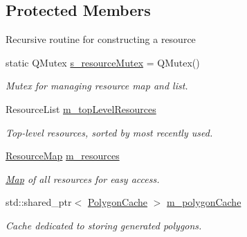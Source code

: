 \subsection*{Protected Members}
\label{_amgrp1407774ea7c5b7991aa8e311379c78d1}%
Recursive routine for constructing a resource \begin{DoxyCompactItemize}
\item 
\mbox{\label{classrev_1_1_resource_cache_a9f8b8e9321a559bdb205d26c7ae438ad}} 
static Q\+Mutex \mbox{\hyperlink{classrev_1_1_resource_cache_a9f8b8e9321a559bdb205d26c7ae438ad}{s\+\_\+resource\+Mutex}} = Q\+Mutex()
\begin{DoxyCompactList}\small\item\em Mutex for managing resource map and list. \end{DoxyCompactList}\item 
\mbox{\label{classrev_1_1_resource_cache_a2c953d9ae3fc3ba9b30f72090477ed65}} 
Resource\+List \mbox{\hyperlink{classrev_1_1_resource_cache_a2c953d9ae3fc3ba9b30f72090477ed65}{m\+\_\+top\+Level\+Resources}}
\begin{DoxyCompactList}\small\item\em Top-\/level resources, sorted by most recently used. \end{DoxyCompactList}\item 
\mbox{\hyperlink{classrev_1_1_threaded_map}{Resource\+Map}} \mbox{\hyperlink{classrev_1_1_resource_cache_aabbe4f877eda212ea0b12e30cd5c519e}{m\+\_\+resources}}
\begin{DoxyCompactList}\small\item\em \mbox{\hyperlink{classrev_1_1_map}{Map}} of all resources for easy access. \end{DoxyCompactList}\item 
\mbox{\label{classrev_1_1_resource_cache_a72b85c53b12ec228c33e7906aded6aed}} 
std\+::shared\+\_\+ptr$<$ \mbox{\hyperlink{classrev_1_1_polygon_cache}{Polygon\+Cache}} $>$ \mbox{\hyperlink{classrev_1_1_resource_cache_a72b85c53b12ec228c33e7906aded6aed}{m\+\_\+polygon\+Cache}}
\begin{DoxyCompactList}\small\item\em Cache dedicated to storing generated polygons. \end{DoxyCompactList}\item 
\mbox{\label{classrev_1_1_resource_cache_a20583eb6f96119d6c5d2bd9dfcc782f5}} 

\end{DoxyCompactItemize}
